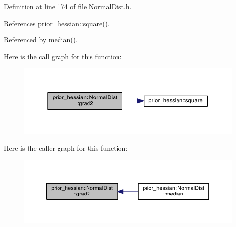 Definition at line 174 of file Normal\+Dist.\+h.



References prior\+\_\+hessian\+::square().



Referenced by median().



Here is the call graph for this function\+:\nopagebreak
\begin{figure}[H]
\begin{center}
\leavevmode
\includegraphics[width=345pt]{classprior__hessian_1_1NormalDist_ab346dd5512cd0ff79d3a8b9e63618126_cgraph}
\end{center}
\end{figure}




Here is the caller graph for this function\+:\nopagebreak
\begin{figure}[H]
\begin{center}
\leavevmode
\includegraphics[width=350pt]{classprior__hessian_1_1NormalDist_ab346dd5512cd0ff79d3a8b9e63618126_icgraph}
\end{center}
\end{figure}


